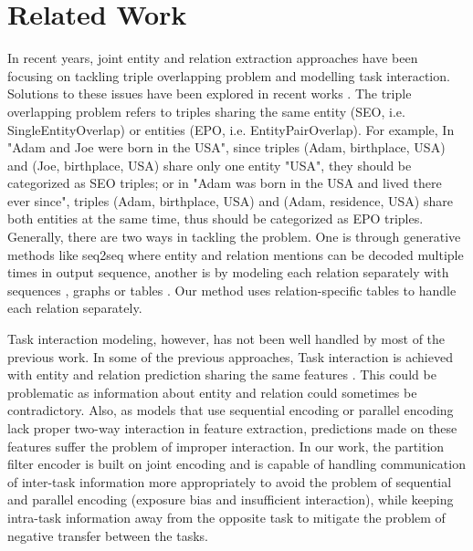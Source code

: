 \documentclass[11pt]{article}
\begin{document}
\section{Related Work}
In recent years, joint entity and relation extraction approaches have been focusing on tackling triple overlapping problem and modelling task interaction. Solutions to these issues have been explored in recent works \citep{zheng-etal-2017-joint, zeng-etal-2018-extracting, zeng-etal-2019-learning, fu-etal-2019-graphrel, wei-etal-2020-novel}. The triple overlapping problem refers to triples sharing the same entity (SEO, i.e. SingleEntityOverlap) or entities (EPO, i.e. EntityPairOverlap). For example, In "Adam and Joe were born in the USA", since triples (Adam, birthplace, USA) and (Joe, birthplace, USA) share only one entity "USA", they should be categorized as SEO triples; or in "Adam was born in the USA and lived there ever since", triples (Adam, birthplace, USA) and (Adam, residence, USA) share both entities at the same time, thus should be categorized as EPO triples. Generally, there are two ways in tackling the problem. One is through generative methods like seq2seq \citep{zeng-etal-2018-extracting, zeng-etal-2019-learning} where entity and relation mentions can be decoded multiple times in output sequence, another is by modeling each relation separately with sequences \citep{wei-etal-2020-novel}, graphs \citep{fu-etal-2019-graphrel} or tables \citep{wang-lu-2020-two}. Our method uses relation-specific tables \citep{miwa-sasaki-2014-modeling} to handle each relation separately.

Task interaction modeling, however, has not been well handled by most of the previous work. In some of the previous approaches, Task interaction is achieved with entity and relation prediction sharing the same features \citep{tran2019neural, wang-etal-2020-tplinker}. This could be problematic as information about entity and relation could sometimes be contradictory. Also, as models that use sequential encoding \citep{bekoulis2018joint, eberts2019span, wei-etal-2020-novel} or parallel encoding \citep{fu-etal-2019-graphrel} lack proper two-way interaction in feature extraction, predictions made on these features suffer the problem of improper interaction. In our work, the partition filter encoder is built on joint encoding and is capable of handling communication of inter-task information more appropriately to avoid the problem of sequential and parallel encoding (exposure bias and insufficient interaction), while keeping intra-task information away from the opposite task to mitigate the problem of negative transfer between the tasks.     
\end{document}
